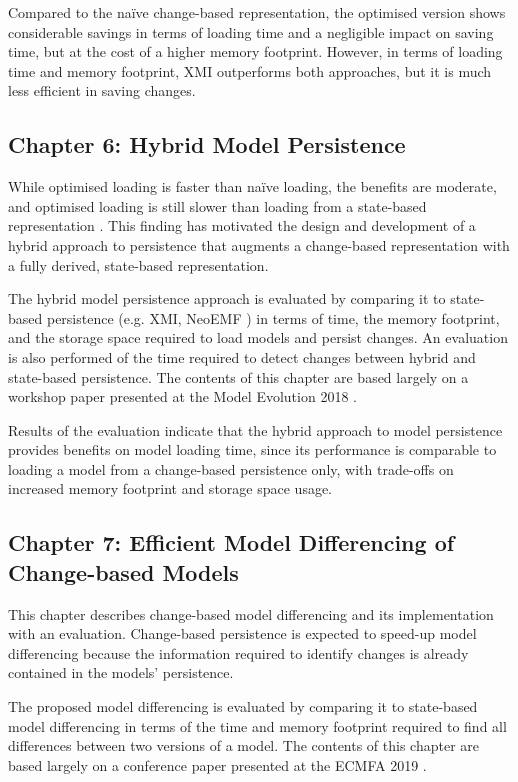 Compared to the naïve change-based representation, the optimised version shows considerable savings in terms of loading time and a negligible impact on saving time, but at the cost of a higher memory footprint. However, in terms of loading time and memory footprint, XMI outperforms both approaches, but it is much less efficient in saving changes.

\subsection{Chapter 6: Hybrid Model Persistence}
\label{sec:chapter_5_hybrid_model_persistence}
While optimised loading is faster than naïve loading, the benefits are moderate, and optimised loading is still slower than loading from a state-based representation \cite{DBLP:conf/models/YohannisRPK18}. This finding has motivated the design and development of a hybrid approach to persistence that augments a change-based representation with a fully derived, state-based representation.

The hybrid model persistence approach is evaluated by comparing it to state-based persistence (e.g. XMI, NeoEMF \cite{daniel2016neoemf}) in terms of time, the memory footprint, and the storage space required to load models and persist changes. An evaluation is also performed of the time required to detect changes between hybrid and state-based persistence. The contents of this chapter are based largely on a workshop paper presented at the Model Evolution 2018 \cite{DBLP:conf/models/YohannisRPK18}.

Results of the evaluation indicate that the hybrid approach to model persistence provides benefits on model loading time, since its performance is comparable to loading a model from a change-based persistence only, with trade-offs on increased memory footprint and storage space usage.

\subsection{Chapter 7: Efficient Model Differencing of Change-based Models}
\label{sec:chapter_6_model_differencing}
This chapter describes change-based model differencing and its implementation with an evaluation. Change-based persistence is expected to speed-up model differencing because the information required to identify changes is already contained in the models’ persistence.

The proposed model differencing is evaluated by comparing it to state-based model differencing in terms of the time and memory footprint required to find all differences between two versions of a model. The contents of this chapter are based largely on a conference paper presented at the ECMFA 2019 \cite{yohannis2019efficient}.

